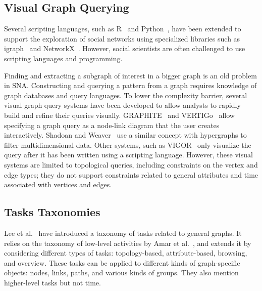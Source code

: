 \subsection{Visual Graph Querying}

Several scripting languages, such as R~\cite{Rstat} and Python~\cite{Python}, have been extended to support the exploration of social networks using specialized libraries such as igraph~\cite{igraph} and NetworkX~\cite{NetworkX}. However, social scientists are often challenged to use scripting languages and programming.

Finding and extracting a subgraph of interest in a bigger graph
is an old problem in SNA. %
%
Constructing and querying a pattern from a graph requires knowledge of graph databases and query languages.
To lower the complexity barrier, several visual graph query systems have been developed to allow analysts to rapidly build and refine their queries visually. GRAPHITE~\cite{chauGRAPHITEVisualQuery2008} and VERTIGo~\cite{cuencaVERTIGoVisualPlatform2021} allow specifying a graph query as a node-link diagram that the user creates interactively. Shadoan and Weaver~\cite{shadoanVisualAnalysisHigherOrder2013} use a similar concept with hypergraphs to filter multidimensional data. Other systems, such as VIGOR~\cite{pientaVIGORInteractiveVisual2018} only visualize the query after it has been written using a scripting language. However, these visual systems are limited to topological queries, including constraints on the vertex and edge types; they do not support constraints related to general attributes and time associated with vertices and edges.

\iffalse
\subsection{Tasks Taxonomies}

Lee et al.~\cite{lee:hal-00851754} have introduced a taxonomy of tasks related to general graphs.
It relies on the taxonomy of low-level activities by Amar et al.~\cite{Amar05}, and extends it by considering different types of tasks: topology-based, attribute-based, browsing, and overview. These tasks can be applied to different kinds of graph-specific objects: nodes, links, paths, and various kinds of groups.
They also mention higher-level tasks but not time.


